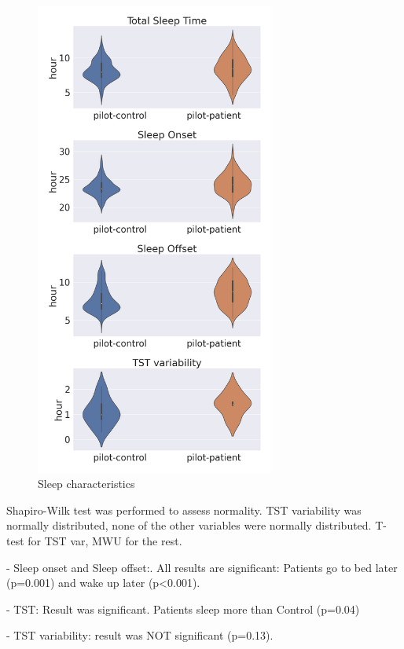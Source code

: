 \documentclass[journal, onecolumn, 11pt]{IEEEtran}
\begin{document}
\begin{figure}[hpt]
  \centering
  \includegraphics[width=0.7\textwidth]{pilot_figs/sleep_param.png}
  \caption{Sleep characteristics}
\end{figure}

Shapiro-Wilk test was performed to assess normality. TST variability was normally distributed, none of the other variables were normally distributed. T-test for TST var, MWU for the rest.

- Sleep onset and Sleep offset:. All results are significant: Patients go to bed later (p=0.001) and wake up later (p<0.001).

- TST: Result was significant. Patients sleep more than Control (p=0.04)

- TST variability: result was NOT significant (p=0.13).
\end{document}
